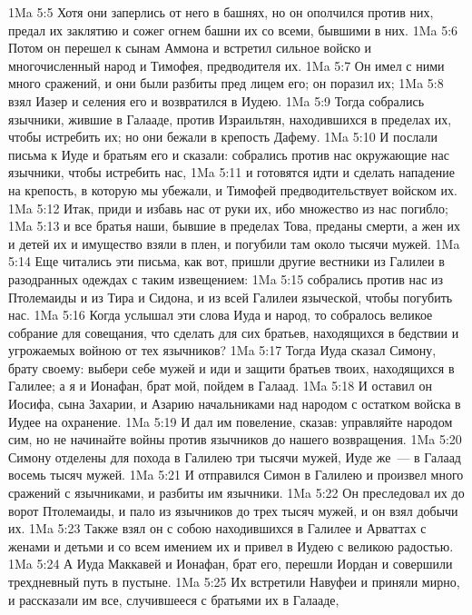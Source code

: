 \vs 1Ma 5:5 Хотя они заперлись от него в башнях, но он ополчился против них, предал их заклятию и сожег огнем башни их со всеми, бывшими в них.
\vs 1Ma 5:6 Потом он перешел к сынам Аммона и встретил сильное войско и многочисленный народ и Тимофея, предводителя их.
\vs 1Ma 5:7 Он имел с ними много сражений, и они были разбиты пред лицем его; он поразил их;
\vs 1Ma 5:8 взял Иазер и селения его и возвратился в Иудею.
\vs 1Ma 5:9 Тогда собрались язычники, жившие в Галааде, против Израильтян, находившихся в пределах их, чтобы истребить их; но они бежали в крепость Дафему.
\vs 1Ma 5:10 И послали письма к Иуде и братьям его и сказали: собрались против нас окружающие нас язычники, чтобы истребить нас,
\vs 1Ma 5:11 и готовятся идти и сделать нападение на крепость, в которую мы убежали, и Тимофей предводительствует войском их.
\vs 1Ma 5:12 Итак, приди и избавь нас от руки их, ибо множество из нас погибло;
\vs 1Ma 5:13 и все братья наши, бывшие в пределах Това, преданы смерти, а жен их и детей их и имущество взяли в плен, и погубили там около тысячи мужей.
\vs 1Ma 5:14 Еще читались эти письма, как вот, пришли другие вестники из Галилеи в разодранных одеждах с таким извещением:
\vs 1Ma 5:15 собрались против нас из Птолемаиды и из Тира и Сидона, и из всей Галилеи языческой, чтобы погубить нас.
\vs 1Ma 5:16 Когда услышал эти слова Иуда и народ, то собралось великое собрание для совещания, что сделать для сих братьев, находящихся в бедствии и угрожаемых войною от тех язычников?
\vs 1Ma 5:17 Тогда Иуда сказал Симону, брату своему: выбери себе мужей и иди и защити братьев твоих, находящихся в Галилее; а я и Ионафан, брат мой, пойдем в Галаад.
\vs 1Ma 5:18 И оставил он Иосифа, сына Захарии, и Азарию начальниками над народом с остатком войска в Иудее на охранение.
\vs 1Ma 5:19 И дал им повеление, сказав: управляйте народом сим, но не начинайте войны против язычников до нашего возвращения.
\vs 1Ma 5:20 Симону отделены для похода в Галилею три тысячи мужей, Иуде же~--- в Галаад восемь тысяч мужей.
\vs 1Ma 5:21 И отправился Симон в Галилею и произвел много сражений с язычниками, и разбиты им язычники.
\vs 1Ma 5:22 Он преследовал их до ворот Птолемаиды, и пало из язычников до трех тысяч мужей, и он взял добычи их.
\vs 1Ma 5:23 Также взял он с собою находившихся в Галилее и Арваттах  с женами и детьми и со всем имением их и привел в Иудею с великою радостью.
\vs 1Ma 5:24 А Иуда Маккавей и Ионафан, брат его, перешли Иордан и совершили трехдневный путь в пустыне.
\vs 1Ma 5:25 Их встретили Навуфеи и приняли мирно, и рассказали им все, случившееся с братьями их в Галааде,
